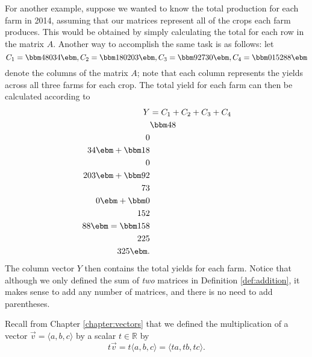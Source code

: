 For another example, suppose we wanted to know the total production for each farm in 2014, assuming that our matrices represent all of the crops each farm produces. This would be obtained by simply calculating the total for each row in the matrix $A$. Another way to accomplish the same task is as follows: let
\[
C_1 = \bbm 48\\0\\34\ebm, C_2 = \bbm 18\\0\\203\ebm, C_3 = \bbm 92\\73\\0\ebm, C_4 = \bbm 0\\152\\88\ebm
\]
denote the columns of the matrix $A$; note that each column represents the yields across all three farms for each crop. The total yield for each farm can then be calculated according to
\begin{align*}
Y & = C_1+C_2+C_3+C_4\\
 & \bbm 48\\0\\34\ebm + \bbm 18\\0\\203\ebm + \bbm 92\\73\\0\ebm + \bbm 0\\152\\88\ebm = \bbm 158\\225\\325\ebm.
\end{align*}
The column vector $Y$ then contains the total yields for each farm. Notice that although we only defined the sum of \textit{two} matrices in Definition \ref{def:addition}, it makes sense to add any number of matrices, and there is no need to add parentheses.

Recall from Chapter \ref{chapter:vectors} that we defined the multiplication of a vector $\vec{v} = \langle a, b, c\rangle$ by a scalar $t\in\mathbb{R}$ by
\[
t\vec{v} = t\langle a, b, c\rangle = \langle ta, tb, tc\rangle.
\]


